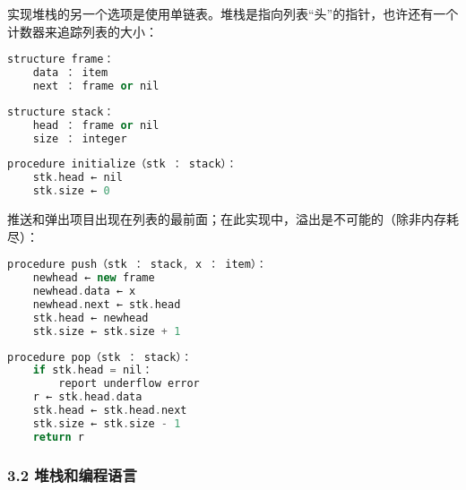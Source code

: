 实现堆栈的另一个选项是使用单链表。堆栈是指向列表“头”的指针，也许还有一个计数器来追踪列表的大小：
\begin{lstlisting}[language=cpp]
structure frame：
    data ： item
    next ： frame or nil
\end{lstlisting}
\begin{lstlisting}[language=cpp]
structure stack：
    head ： frame or nil
    size ： integer
\end{lstlisting}
\begin{lstlisting}[language=cpp]
procedure initialize（stk ： stack）：
    stk.head ← nil
    stk.size ← 0
\end{lstlisting}
推送和弹出项目出现在列表的最前面；在此实现中，溢出是不可能的（除非内存耗尽）：
\begin{lstlisting}[language=cpp]
procedure push（stk ： stack, x ： item）：
    newhead ← new frame
    newhead.data ← x
    newhead.next ← stk.head
    stk.head ← newhead
    stk.size ← stk.size + 1
\end{lstlisting}
\begin{lstlisting}[language=cpp]
procedure pop（stk ： stack）：
    if stk.head = nil：
        report underflow error
    r ← stk.head.data
    stk.head ← stk.head.next
    stk.size ← stk.size - 1
    return r
\end{lstlisting}

\subsubsection{3.2 堆栈和编程语言}